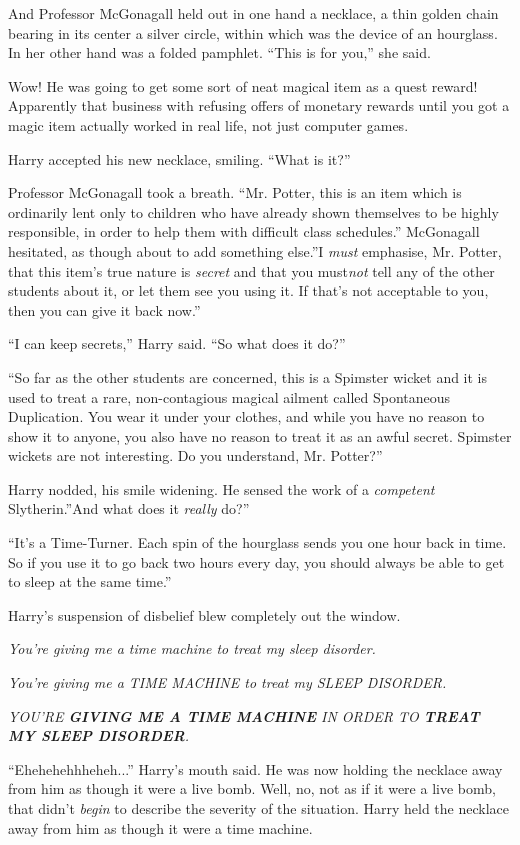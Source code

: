 And Professor McGonagall held out in one hand a necklace, a thin golden
chain bearing in its center a silver circle, within which was the device
of an hourglass. In her other hand was a folded pamphlet. ``This is for
you,'' she said.

Wow! He was going to get some sort of neat magical item as a quest
reward! Apparently that business with refusing offers of monetary
rewards until you got a magic item actually worked in real life, not
just computer games.

Harry accepted his new necklace, smiling. ``What is it?''

Professor McGonagall took a breath. ``Mr. Potter, this is an item which
is ordinarily lent only to children who have already shown themselves to
be highly responsible, in order to help them with difficult class
schedules.'' McGonagall hesitated, as though about to add something
else.''I \emph{must} emphasise, Mr. Potter, that this item's true nature
is \emph{secret} and that you must\emph{not} tell any of the other
students about it, or let them see you using it. If that's not
acceptable to you, then you can give it back now.''

``I can keep secrets,'' Harry said. ``So what does it do?''

``So far as the other students are concerned, this is a Spimster wicket
and it is used to treat a rare, non-contagious magical ailment called
Spontaneous Duplication. You wear it under your clothes, and while you
have no reason to show it to anyone, you also have no reason to treat it
as an awful secret. Spimster wickets are not interesting. Do you
understand, Mr. Potter?''

Harry nodded, his smile widening. He sensed the work of a
\emph{competent} Slytherin.''And what does it \emph{really} do?''

``It's a Time-Turner. Each spin of the hourglass sends you one hour back
in time. So if you use it to go back two hours every day, you should
always be able to get to sleep at the same time.''

Harry's suspension of disbelief blew completely out the window.

\emph{You're giving me a time machine to treat my sleep disorder.}

\emph{You're giving me a TIME MACHINE to treat my SLEEP DISORDER.}

\emph{YOU'RE \textbf{GIVING ME A TIME MACHINE} IN ORDER TO \textbf{TREAT
MY SLEEP DISORDER}.}

``Ehehehehhheheh...'' Harry's mouth said. He was now holding the
necklace away from him as though it were a live bomb. Well, no, not as
if it were a live bomb, that didn't \emph{begin} to describe the
severity of the situation. Harry held the necklace away from him as
though it were a time machine.

